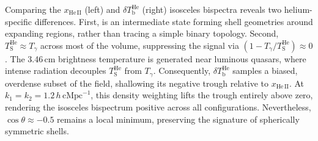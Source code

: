 \documentclass[apj,twocolumn, appendixfloats, twocolappendix, numberedappendix, tighten]{openjournal}
\begin{document}





Comparing the $x_\mathrm{He\,II}$ (left) and $\delta T_\mathrm{b}^\mathrm{He}$ (right) isosceles bispectra reveals two helium-specific differences. First,  is an intermediate state forming shell geometries around expanding  regions, rather than tracing a simple binary topology. Second, $T_\mathrm{S}^\mathrm{He} \approx T_\gamma$ across most of the volume, suppressing the signal via $(1 - T_\gamma/T_\mathrm{S}^\mathrm{He}) \approx 0$. The 3.46\,cm brightness temperature is generated near luminous quasars, where intense radiation decouples $T_\mathrm{S}^\mathrm{He}$ from $T_\gamma$. Consequently, $\delta T_\mathrm{b}^\mathrm{He}$ samples a biased, overdense subset of the  field, shallowing its negative trough relative to $x_\mathrm{He\,II}$. At $k_1 = k_2 = 1.2\,h\,\mathrm{cMpc}^{-1}$, this density weighting lifts the trough entirely above zero, rendering the isosceles bispectrum positive across all configurations. Nevertheless, $\cos\theta \approx -0.5$ remains a local minimum, preserving the signature of spherically symmetric  shells.
\end{document}
